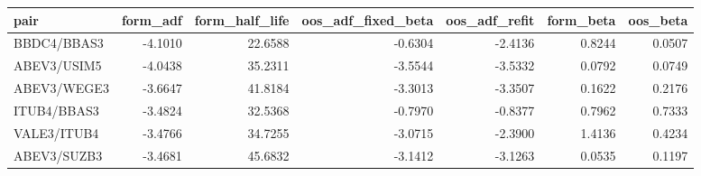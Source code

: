 
\begin{tabular}{lrrrrrr}
\toprule
pair & form\_adf & form\_half\_life & oos\_adf\_fixed\_beta & oos\_adf\_refit & form\_beta & oos\_beta\\
\midrule
BBDC4/BBAS3 & -4.1010 & 22.6588 & -0.6304 & -2.4136 & 0.8244 & 0.0507\\
ABEV3/USIM5 & -4.0438 & 35.2311 & -3.5544 & -3.5332 & 0.0792 & 0.0749\\
ABEV3/WEGE3 & -3.6647 & 41.8184 & -3.3013 & -3.3507 & 0.1622 & 0.2176\\
ITUB4/BBAS3 & -3.4824 & 32.5368 & -0.7970 & -0.8377 & 0.7962 & 0.7333\\
VALE3/ITUB4 & -3.4766 & 34.7255 & -3.0715 & -2.3900 & 1.4136 & 0.4234\\
\addlinespace
ABEV3/SUZB3 & -3.4681 & 45.6832 & -3.1412 & -3.1263 & 0.0535 & 0.1197\\
\bottomrule
\end{tabular}
